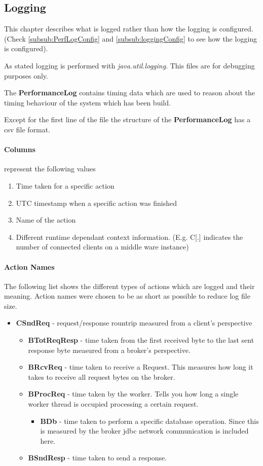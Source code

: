 \documentclass[a4paper]{article}
\begin{document}
\subsection{Logging}
This chapter describes what is logged rather than how the logging is configured. (Check \ref{subsub:PerfLogConfig} and \ref{subsub:loggingConfig} to see how the logging is configured).

As stated logging is performed with \textit{java.util.logging}. This files are for debugging purposes only.

The \textbf{PerformanceLog} contains timing data which are used to reason about the timing behaviour of the system which has been build.

Except for the first line of the file the structure of the \textbf{PerformanceLog} has a csv file format.


\paragraph{Columns} represent the following values
\begin{enumerate}
\item Time taken for a specific action
\item UTC timestamp when a specific action was finished
\item Name of the action
\item Different runtime dependant context information. (E.g. C[.] indicates the number of connected clients on a middle ware instance)
\end{enumerate}

\paragraph{Action Names} The following list shows the different types of actions which are logged and their meaning. Action names were chosen to be as short as possible to reduce log file size.

\begin{itemize}
\item \textbf{CSndReq} - request/response rountrip measured from a client's perspective 
	\begin{itemize}
	\item \textbf{BTotReqResp} - time taken from the first received byte to the last sent response byte measured from a broker's perspective.
	\item \textbf{BRcvReq} - time taken to receive a Request. This measures how long it takes to receive all request bytes on the broker.
	\item \textbf{BProcReq} - time taken by the worker. Tells you how long a single worker thread is occupied processing a certain request.
		\begin{itemize}
   		\item \textbf{BDb} - time taken to perform a specific database operation. Since this is measured by the broker jdbc network communication is included here.
   		\end{itemize}
	\item \textbf{BSndResp} - time taken to send a response.
	\end{itemize}
\end{itemize}
\end{document}
